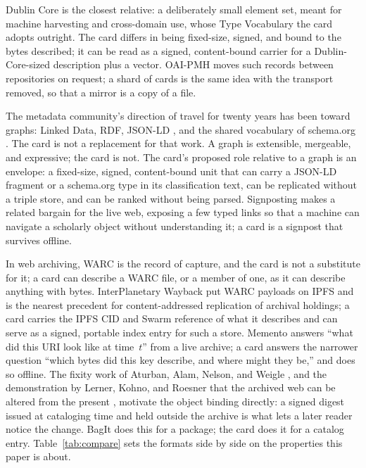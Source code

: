 \documentclass[sigconf]{acmart}
\begin{document}
Dublin Core \cite{Kunze:2007} is the closest relative: a deliberately small
element set, meant for machine harvesting and cross-domain use, whose Type
Vocabulary the card adopts outright. The card differs in being fixed-size,
signed, and bound to the bytes described; it can be read as a signed,
content-bound carrier for a Dublin-Core-sized description plus a vector.
OAI-PMH \cite{Lagoze:2001} moves such records between repositories on request;
a shard of cards is the same idea with the transport removed, so that a mirror
is a copy of a file.

The metadata community's direction of travel for twenty years has been toward
graphs: Linked Data, RDF, JSON-LD \cite{Kellogg:2020}, and the shared
vocabulary of schema.org \cite{Guha:2016}. The card is not a replacement for
that work. A graph is extensible, mergeable, and expressive; the card is not.
The card's proposed role relative to a graph is an envelope: a fixed-size,
signed, content-bound unit that can carry a JSON-LD fragment or a schema.org
type in its classification text, can be replicated without a triple store,
and can be ranked without being parsed. Signposting \cite{VanDeSompel:2015}
makes a related bargain for the live web, exposing a few typed links so that a
machine can navigate a scholarly object without understanding it; a card is a
signpost that survives offline.

In web archiving, WARC \cite{ISO:2017} is the record of capture, and the card
is not a substitute for it; a card can describe a WARC file, or a member of
one, as it can describe anything with bytes. InterPlanetary Wayback
\cite{Alam:2016} put WARC payloads on IPFS and is the nearest precedent for
content-addressed replication of archival holdings; a card carries the IPFS
CID and Swarm reference of what it describes and can serve as a signed,
portable index entry for such a store. Memento \cite{VanDeSompel:2013} answers
``what did this URI look like at time~$t$'' from a live archive; a card
answers the narrower question ``which bytes did this key describe, and where
might they be,'' and does so offline. The fixity work of Aturban, Alam,
Nelson, and Weigle \cite{Aturban:2019}, and the demonstration by Lerner, Kohno,
and Roesner that the archived web can be altered from the present
\cite{Lerner:2017}, motivate the object binding directly: a signed digest
issued at cataloging time and held outside the archive is what lets a later
reader notice the change. BagIt \cite{Kunze:2018} does this for a package;
the card does it for a catalog entry. Table~\ref{tab:compare} sets the
formats side by side on the properties this paper is about.
\end{document}
